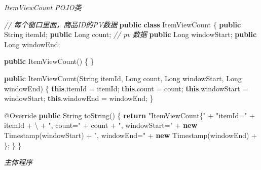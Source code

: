\documentclass[cn,11pt,chinese]{elegantbook}
\newenvironment{Shaded}{}{}
\newcommand{\AttributeTok}[1]{\textcolor[rgb]{0.49,0.56,0.16}{#1}}
\newcommand{\BuiltInTok}[1]{#1}
\newcommand{\CharTok}[1]{\textcolor[rgb]{0.25,0.44,0.63}{#1}}
\newcommand{\CommentTok}[1]{\textcolor[rgb]{0.38,0.63,0.69}{\textit{#1}}}
\newcommand{\FunctionTok}[1]{\textcolor[rgb]{0.02,0.16,0.49}{#1}}
\newcommand{\KeywordTok}[1]{\textcolor[rgb]{0.00,0.44,0.13}{\textbf{#1}}}
\newcommand{\NormalTok}[1]{#1}
\newcommand{\StringTok}[1]{\textcolor[rgb]{0.25,0.44,0.63}{#1}}
\begin{document}
\emph{ItemViewCount POJO类}

\begin{Shaded}
\begin{Highlighting}[]
\CommentTok{// 每个窗口里面，商品ID的PV数据}
\KeywordTok{public} \KeywordTok{class}\NormalTok{ ItemViewCount \{}
    \KeywordTok{public} \BuiltInTok{String}\NormalTok{ itemId;}
    \KeywordTok{public} \BuiltInTok{Long}\NormalTok{ count; }\CommentTok{// pv 数据}
    \KeywordTok{public} \BuiltInTok{Long}\NormalTok{ windowStart;}
    \KeywordTok{public} \BuiltInTok{Long}\NormalTok{ windowEnd;}

    \KeywordTok{public} \FunctionTok{ItemViewCount}\NormalTok{() \{}
\NormalTok{    \}}

    \KeywordTok{public} \FunctionTok{ItemViewCount}\NormalTok{(}\BuiltInTok{String}\NormalTok{ itemId, }\BuiltInTok{Long}\NormalTok{ count, }\BuiltInTok{Long}\NormalTok{ windowStart, }\BuiltInTok{Long}\NormalTok{ windowEnd) \{}
        \KeywordTok{this}\NormalTok{.}\FunctionTok{itemId}\NormalTok{ = itemId;}
        \KeywordTok{this}\NormalTok{.}\FunctionTok{count}\NormalTok{ = count;}
        \KeywordTok{this}\NormalTok{.}\FunctionTok{windowStart}\NormalTok{ = windowStart;}
        \KeywordTok{this}\NormalTok{.}\FunctionTok{windowEnd}\NormalTok{ = windowEnd;}
\NormalTok{    \}}

    \AttributeTok{@Override}
    \KeywordTok{public} \BuiltInTok{String} \FunctionTok{toString}\NormalTok{() \{}
        \KeywordTok{return} \StringTok{"ItemViewCount\{"}\NormalTok{ +}
                \StringTok{"itemId=\textquotesingle{}"}\NormalTok{ + itemId + }\CharTok{\textquotesingle{}\textbackslash{}\textquotesingle{}\textquotesingle{}}\NormalTok{ +}
                \StringTok{", count="}\NormalTok{ + count +}
                \StringTok{", windowStart="}\NormalTok{ + }\KeywordTok{new} \BuiltInTok{Timestamp}\NormalTok{(windowStart) +}
                \StringTok{", windowEnd="}\NormalTok{ + }\KeywordTok{new} \BuiltInTok{Timestamp}\NormalTok{(windowEnd) +}
                \CharTok{\textquotesingle{}\}\textquotesingle{}}\NormalTok{;}
\NormalTok{    \}}
\NormalTok{\}}
\end{Highlighting}
\end{Shaded}

\emph{主体程序}
\end{document}
